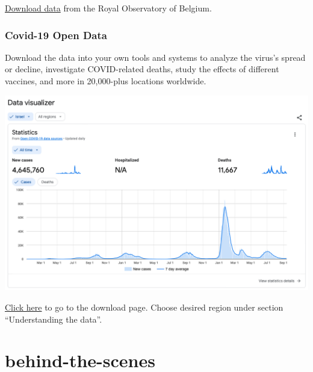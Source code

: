 \documentclass[
  letterpaper,
  DIV=11,
  numbers=noendperiod,
  oneside]{scrreprt}
\begin{document}

\href{https://www.sidc.be/SILSO/datafiles}{Download data} from the Royal
Observatory of Belgium.

\hypertarget{covid-19-open-data}{%
\section{Covid-19 Open Data}\label{covid-19-open-data}}

Download the data into your own tools and systems to analyze the virus's
spread or decline, investigate COVID-related deaths, study the effects
of different vaccines, and more in 20,000-plus locations worldwide.

\includegraphics{technical-stuff/covid19-israel.png}


\href{https://health.google.com/covid-19/open-data/raw-data?loc=IL}{Click
here} to go to the download page. Choose desired region under section
``Understanding the data''.

\part{behind-the-scenes}
\end{document}

